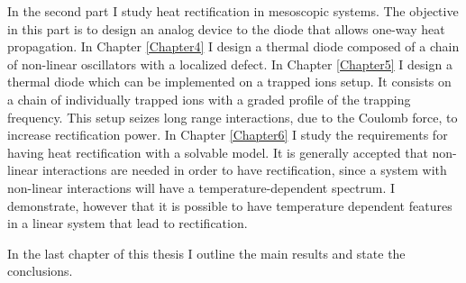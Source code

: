 In the second part I study heat rectification in mesoscopic systems. The objective in this part is to design an analog device to the diode that allows one-way heat propagation. In Chapter \ref{Chapter4} I design a thermal diode composed of a chain of non-linear oscillators with a localized defect. In Chapter \ref{Chapter5} I design a thermal diode which can be implemented on a trapped ions setup. It consists on a chain of individually trapped ions with a graded profile of the trapping frequency. This setup seizes long range interactions, due to the Coulomb force, to increase rectification power. In Chapter \ref{Chapter6} I study the requirements for having heat rectification with a solvable model. It is generally accepted that non-linear interactions are needed in order to have rectification, since a system with non-linear interactions will have a temperature-dependent spectrum. I demonstrate, however that it is possible to have temperature dependent features in a linear system that lead to rectification.

In the last chapter of this thesis I outline the main results and state the conclusions.








